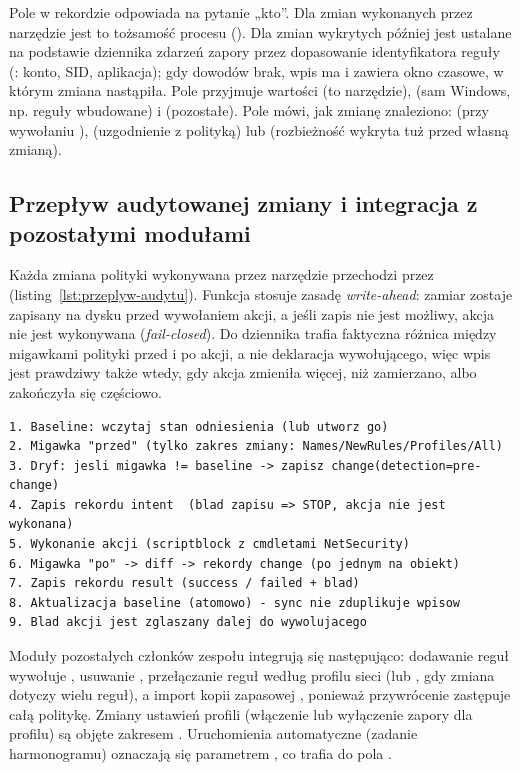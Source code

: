 Pole  w rekordzie  odpowiada na pytanie „kto”. Dla zmian wykonanych przez narzędzie jest to tożsamość procesu (). Dla zmian wykrytych później jest ustalane na podstawie dziennika zdarzeń zapory przez dopasowanie identyfikatora reguły (: konto, SID, aplikacja); gdy dowodów brak, wpis ma  i zawiera okno czasowe, w którym zmiana nastąpiła. Pole  przyjmuje wartości  (to narzędzie),  (sam Windows, np. reguły wbudowane) i  (pozostałe). Pole  mówi, jak zmianę znaleziono:  (przy wywołaniu ),  (uzgodnienie z polityką) lub  (rozbieżność wykryta tuż przed własną zmianą).

\subsection{Przepływ audytowanej zmiany i integracja z pozostałymi modułami}\label{subsec:przeplyw-audytu}

Każda zmiana polityki wykonywana przez narzędzie przechodzi przez  (listing~\ref{lst:przeplyw-audytu}). Funkcja stosuje zasadę \emph{write-ahead}: zamiar zostaje zapisany na dysku przed wywołaniem akcji, a jeśli zapis nie jest możliwy, akcja nie jest wykonywana (\emph{fail-closed}). Do dziennika trafia faktyczna różnica między migawkami polityki przed i po akcji, a nie deklaracja wywołującego, więc wpis jest prawdziwy także wtedy, gdy akcja zmieniła więcej, niż zamierzano, albo zakończyła się częściowo.

\begin{lstlisting}[caption={Przepływ transakcji audytowanej},label={lst:przeplyw-audytu}]
1. Baseline: wczytaj stan odniesienia (lub utworz go)
2. Migawka "przed" (tylko zakres zmiany: Names/NewRules/Profiles/All)
3. Dryf: jesli migawka != baseline -> zapisz change(detection=pre-change)
4. Zapis rekordu intent  (blad zapisu => STOP, akcja nie jest wykonana)
5. Wykonanie akcji (scriptblock z cmdletami NetSecurity)
6. Migawka "po" -> diff -> rekordy change (po jednym na obiekt)
7. Zapis rekordu result (success / failed + blad)
8. Aktualizacja baseline (atomowo) - sync nie zduplikuje wpisow
9. Blad akcji jest zglaszany dalej do wywolujacego
\end{lstlisting}

Moduły pozostałych członków zespołu integrują się następująco: dodawanie reguł wywołuje , usuwanie , przełączanie reguł według profilu sieci  (lub , gdy zmiana dotyczy wielu reguł), a import kopii zapasowej , ponieważ przywrócenie zastępuje całą politykę. Zmiany ustawień profili (włączenie lub wyłączenie zapory dla profilu) są objęte zakresem . Uruchomienia automatyczne (zadanie harmonogramu) oznaczają się parametrem , co trafia do pola .


